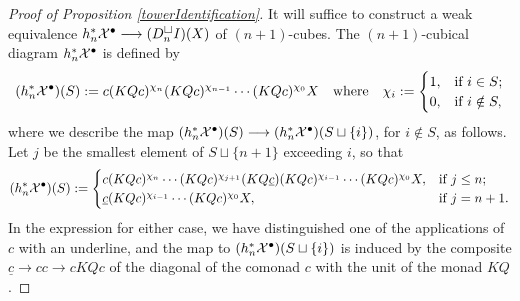 \documentclass[11pt]{amsart}
\theoremstyle{plain}
\begin{document}
\begin{proof}[Proof of Proposition \ref{towerIdentification}]
It will suffice to construct a weak equivalence $h_n^*\mathcal{X}^\bullet\longrightarrow (D_n^{\smash{\square}}I)(X)$ of $(n+1)$-cubes. The $(n+1)$-cubical diagram $h_n^*\mathcal{X}^\bullet$ is defined by
\[(h_n^*\mathcal{X}^\bullet)(S):= c(KQc)^{\chi_{n}}(KQc)^{\chi_{n-1}}\cdots (KQc)^{\chi_0}X\quad \textup{where}\quad \chi_i:=\begin{cases}
1,&\textup{if }i\in S;\\
0,&\textup{if }i\notin S,
\end{cases}
\]
where we describe the map $(h_n^*\mathcal{X}^\bullet)(S)\longrightarrow (h_n^*\mathcal{X}^\bullet)(S\sqcup\{i\})$, for $i\notin S$, as follows. Let $j$ be the smallest element of $S\sqcup\{n+1\}$ exceeding $i$, so that
\[(h_n^*\mathcal{X}^\bullet)(S):= \begin{cases}
c(KQc)^{\chi_{n}}\cdots (KQc)^{\chi_{j+1}}(KQ\underline{c})(KQc)^{\chi_{i-1}}\cdots (KQc)^{\chi_0}X,&\textup{if }j\leq n;\\
\underline{c}(KQc)^{\chi_{i-1}}\cdots (KQc)^{\chi_0}X,&\textup{if }j=n+1.
\end{cases}
\]
In the expression for either case, we have distinguished one of the applications of $c$ with an underline, and the map to $(h_n^*\mathcal{X}^\bullet)(S\sqcup\{i\})$ is induced by the composite $\underline{c}\to cc\to cKQc$ of the diagonal of the comonad $c$ with the unit of the monad $KQ$. %



\end{proof}
\end{document}

